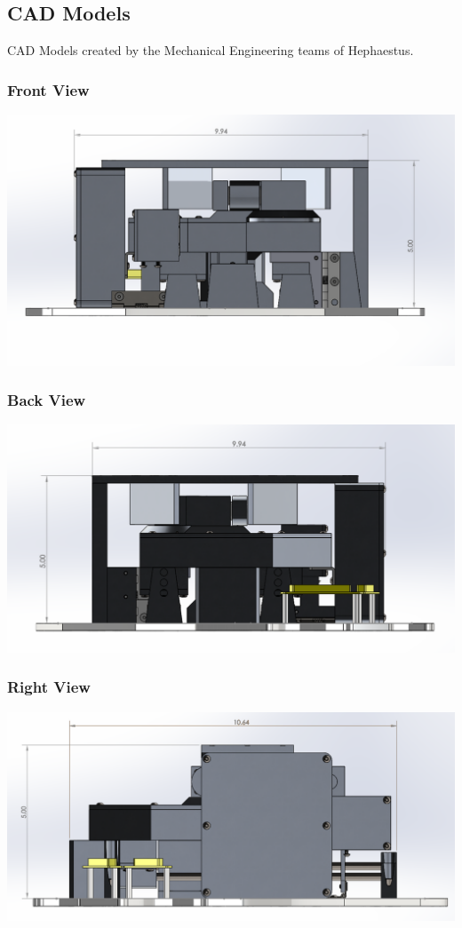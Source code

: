 \subsection{CAD Models}
CAD Models created by the Mechanical Engineering teams of Hephaestus.

\subsubsection{Front View}
\includegraphics[width=\textwidth]{./images/CAD/FRONT}
\subsubsection{Back View}
\includegraphics[width=\textwidth]{./images/CAD/BACK}
\subsubsection{Right View}
\includegraphics[width=\textwidth]{./images/CAD/RIGHT}
